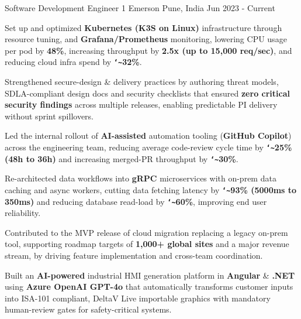 

\begin{cventries}

  \cventry
    {Software Development Engineer 1} %
    {Emerson} %
    {Pune, India} %
    {Jun 2023 - Current} %
    {
      \begin{cvitems} %
        \item {Set up and optimized \textbf{Kubernetes (K3S on Linux)} infrastructure through resource tuning, and \textbf{Grafana/Prometheus} monitoring, lowering CPU usage per pod by \textbf{48\%}, increasing throughput by \textbf{2.5x (up to 15,000 req/sec)}, and reducing cloud infra spend by \textbf{\texttt{\char`\~}32\%}.}
        \item {Strengthened secure-design \& delivery practices by authoring threat models, SDLA-compliant design docs and security checklists that ensured \textbf{zero critical security findings} across multiple releases, enabling predictable PI delivery without sprint spillovers.}
        \item {Led the internal rollout of \textbf{AI-assisted} automation tooling (\textbf{GitHub Copilot}) across the engineering team, reducing average code-review cycle time by \textbf{\texttt{\char`\~}25\% (48h to 36h)} and increasing merged-PR throughput by \textbf{\texttt{\char`\~}30\%}.}
        \item {Re-architected data workflows into \textbf{gRPC} microservices with on-prem data caching and async workers, cutting data fetching latency by \textbf{\texttt{\char`\~}93\% (5000ms to 350ms)} and reducing database read-load by \textbf{\texttt{\char`\~}60\%}, improving end user reliability.}
        \item {Contributed to the MVP release of cloud migration replacing a legacy on-prem tool, supporting roadmap targets of \textbf{1,000+ global sites} and a major revenue stream, by driving feature implementation and cross-team coordination.}
        \item {Built an \textbf{AI-powered} industrial HMI generation platform in \textbf{Angular} \& \textbf{.NET} using \textbf{Azure OpenAI GPT-4o} that automatically transforms customer inputs into ISA-101 compliant, DeltaV Live importable graphics with mandatory human-review gates for safety-critical systems.}
      \end{cvitems}
    }
    

\end{cventries}
